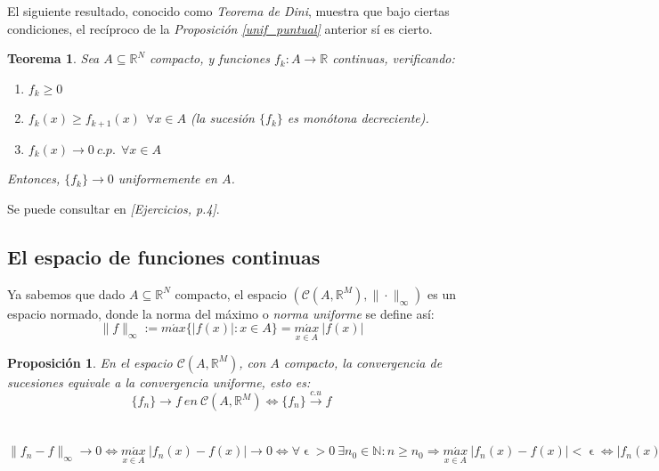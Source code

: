 \documentclass[11pt, a4paper]{article}
\makeatletter
\newif\IfInSansMode
\let\oldsf\sffamily
\renewcommand*{\sffamily}{\oldsf\mathversion{sans}\InSansModetrue}
\let\oldnorm\normalfont
\renewcommand*{\normalfont}{\oldnorm\InSansModefalse\mathversion{normal}}
\let\epsilon\upvarepsilon
\newcommand{\R}{\mathbb{R}} \newcommand{\N}{\mathbb{N}}
\newcommand{\fn}{\{f_n\}}
\renewenvironment{proof}[1][\proofname] {\par\pushQED{\qed}\normalfont\topsep6\p@\@plus6\p@\relax\trivlist\item[\hskip\labelsep\itshape\sffamily#1\@addpunct{.}]\ignorespaces}{\popQED\endtrivlist\@endpefalse}
\theoremstyle{theorem-style}
\newtheorem{nth}{Teorema}[section]
\newtheorem{nprop}{Proposición}[section]
\theoremstyle{definition-style}
\theoremstyle{remark-style}
\theoremstyle{example-style}
\newenvironment{nlist}
{\begin{enumerate}
    \renewcommand\labelenumi{(\emph{\roman{enumi})}}}
  {\end{enumerate}}
\makeatother
\begin{document}
El siguiente resultado, conocido como \textit{Teorema de Dini}, muestra que bajo ciertas condiciones, el recíproco de la \textit{Proposición \ref{unif_puntual}} anterior sí es cierto.

\begin{nth}
  \label{1}
  Sea $A\subseteq \R^N$ compacto, y funciones $f_k : A \to \mathbb{R}$ continuas, verificando:

  \begin{nlist}
  \item $f_k \geq 0$
  \item $f_k(x) \geq f_{k+1}(x)\ \ \forall x \in A$ (la sucesión $\{f_k\}$ es monótona decreciente).
  \item $f_k(x) \to 0\ c.p.\ \ \forall x \in A$
  \end{nlist}

  Entonces, $\{f_k\} \to 0$ uniformemente en $A$.
\end{nth}

  \begin{proof}
    Se puede consultar en \textit{[Ejercicios, p.4]}.
  \end{proof}


\subsection{El espacio de funciones continuas}

Ya sabemos que dado $A\subseteq \mathbb{R}^N$ compacto, el espacio $(\mathcal{C}(A,\mathbb{R}^M), \|\cdot\|_{\infty})$ es un espacio normado, donde la norma del máximo o \textit{norma uniforme} se define así: $$\|f\|_{\infty} := m\acute{a}x \{ |f(x)|: x \in A\} = \underset{x\in A}{m\acute{a}x} \ |f(x)|$$

\begin{nprop} En el espacio $\mathcal{C}(A,\mathbb{R}^M)$, con $A$ compacto, la convergencia de sucesiones equivale a la convergencia uniforme, esto es: $$\fn \rightarrow f\ en\ \mathcal{C}(A,\mathbb{R}^M) \iff \fn \xrightarrow {c.u} f$$
\end{nprop}

  \begin{proof} \hfill \\
    $\|f_n - f \|_{\infty} \rightarrow 0 \iff \underset{x \in A}{m\acute{a}x} \ |f_n(x) - f(x)| \rightarrow 0 \iff \forall \epsilon > 0\ \exists n_0 \in \mathbb{N}: n \ge n_0 \Rightarrow \underset{x \in A}{m\acute{a}x} \ |f_n(x) - f(x)| < \epsilon \iff |f_n(x) - f(x)| < \epsilon\  \forall x \in A \iff \fn \xrightarrow {c.u} f.$
  \end{proof}
\end{document}
